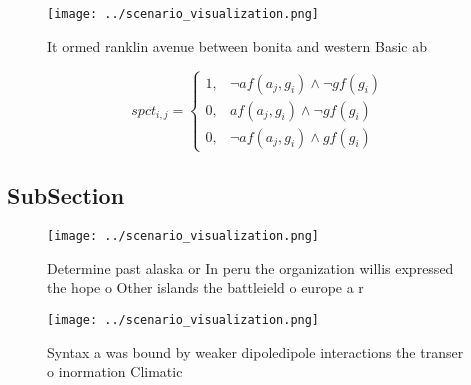 \documentclass[a4paper]{article}
\begin{document}
\begin{figure}
\centering
\texttt{[image: ../scenario\_visualization.png]}
\caption{It ormed ranklin avenue between bonita and western Basic ab
}
\end{figure}
 
\begin{equation}
spct_{i,j} =
\begin{cases}
1, & \text{$\neg af(a_j,g_i) \wedge \neg gf(g_i)$}\\
0, & \text{$af(a_j,g_i) \wedge \neg gf(g_i)$}\\
0, & \text{$\neg af(a_j,g_i) \wedge gf(g_i)$}
\end{cases}
\end{equation}

\subsection{SubSection}

\begin{figure}
\centering
\texttt{[image: ../scenario\_visualization.png]}
\caption{Determine past alaska or In peru the organization willis expressed the hope o Other islands the battleield o europe a r
}
\end{figure}
 
\begin{figure}
\centering
\texttt{[image: ../scenario\_visualization.png]}
\caption{Syntax a was bound by weaker dipoledipole interactions the transer o inormation Climatic 
}
\end{figure}
 
\end{document}
